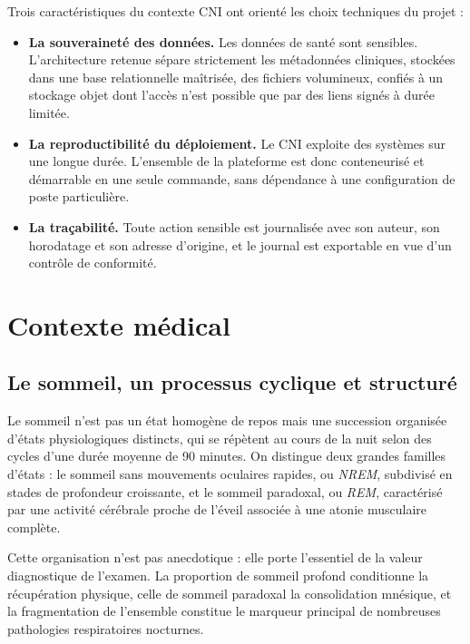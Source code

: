 Trois caractéristiques du contexte CNI ont orienté les choix techniques du projet :

\begin{itemize}[itemsep=2pt,topsep=4pt]
  \item \textbf{La souveraineté des données.} Les données de santé sont sensibles.
        L'architecture retenue sépare strictement les métadonnées cliniques, stockées
        dans une base relationnelle maîtrisée, des fichiers volumineux, confiés à un
        stockage objet dont l'accès n'est possible que par des liens signés à durée
        limitée.
  \item \textbf{La reproductibilité du déploiement.} Le CNI exploite des systèmes sur
        une longue durée. L'ensemble de la plateforme est donc conteneurisé et
        démarrable en une seule commande, sans dépendance à une configuration de
        poste particulière.
  \item \textbf{La traçabilité.} Toute action sensible est journalisée avec son
        auteur, son horodatage et son adresse d'origine, et le journal est exportable
        en vue d'un contrôle de conformité.
\end{itemize}

\section{Contexte médical}

\subsection{Le sommeil, un processus cyclique et structuré}

Le sommeil n'est pas un état homogène de repos mais une succession organisée d'états
physiologiques distincts, qui se répètent au cours de la nuit selon des cycles d'une
durée moyenne de 90 minutes. On distingue deux grandes familles d'états : le sommeil
sans mouvements oculaires rapides, ou \emph{NREM}, subdivisé en stades de profondeur
croissante, et le sommeil paradoxal, ou \emph{REM}, caractérisé par une activité
cérébrale proche de l'éveil associée à une atonie musculaire complète.

Cette organisation n'est pas anecdotique : elle porte l'essentiel de la valeur
diagnostique de l'examen. La proportion de sommeil profond conditionne la
récupération physique, celle de sommeil paradoxal la consolidation mnésique, et la
fragmentation de l'ensemble constitue le marqueur principal de nombreuses pathologies
respiratoires nocturnes.

